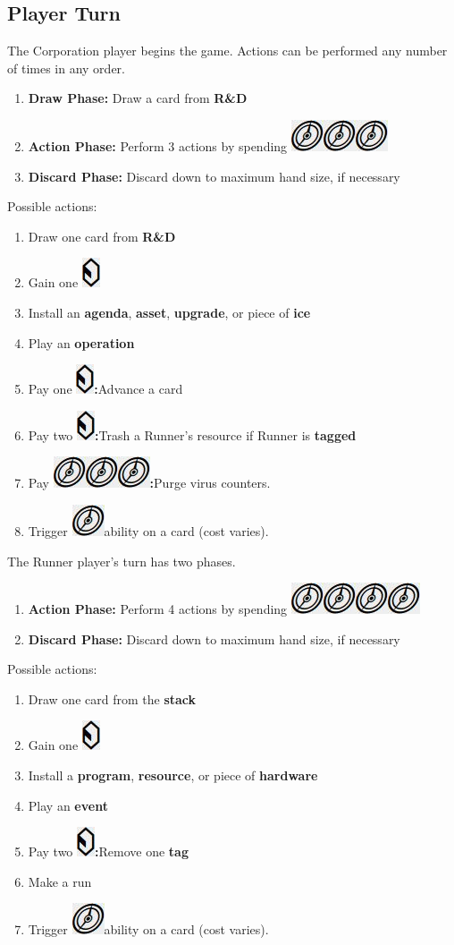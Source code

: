 \documentclass[12pt]{article}
\newenvironment{enumerateCustom}
{\begin{enumerate}
  \setlength{\itemsep}{1pt}
  \setlength{\parskip}{0pt}
  \setlength{\parsep}{0pt}}
{\end{enumerate}}
\newcommand{\credit}{\includegraphics[scale=0.40]{images/creditLarge.jpg}\hspace{0.3em}}
\newcommand{\creditWithColon}{\includegraphics[scale=0.45]{images/creditLarge.jpg}\textbf{:}\hspace{0.3em}}
\newcommand{\action}{\includegraphics[scale=0.40]{images/actionLarge.jpg}\hspace{0.3em}}
\newcommand{\actionWithColon}{\includegraphics[scale=0.45]{images/actionLarge.jpg}\textbf{:}\hspace{0.3em}}
\begin{document}
\begin{multicols*}{2}
\section*{Player Turn}
The Corporation player begins the game. Actions can be performed any number of times in any order.
\begin{enumerateCustom}
	\item \textbf{Draw Phase:} Draw a card from \textbf{R\&D}
	\item \textbf{Action Phase:} Perform 3 actions by spending \action \action \action
	\item \textbf{Discard Phase:} Discard down to maximum hand size, if necessary
\end{enumerateCustom}
Possible actions:
\begin{enumerateCustom}
	\item Draw one card from \textbf{R\&D}
	\item Gain one \credit
	\item Install an \textbf{agenda}, \textbf{asset}, \textbf{upgrade}, or piece of \textbf{ice}
	\item Play an \textbf{operation}
	\item Pay one \creditWithColon Advance a card
	\item Pay two \creditWithColon Trash a Runner's resource if Runner is \textbf{tagged}
	\item Pay \action \action \actionWithColon Purge virus counters.
	\item Trigger \action ability on a card (cost varies).
\end{enumerateCustom}

The Runner player's turn has two phases.
\begin{enumerateCustom}
	\item \textbf{Action Phase:} Perform 4 actions by spending \action \action \action \action
	\item \textbf{Discard Phase:} Discard down to maximum hand size, if necessary
\end{enumerateCustom}
Possible actions:
\begin{enumerateCustom}
	\item Draw one card from the \textbf{stack}
	\item Gain one \credit
	\item Install a \textbf{program}, \textbf{resource}, or piece of \textbf{hardware}
	\item Play an \textbf{event}
	\item Pay two \creditWithColon Remove one \textbf{tag}
	\item Make a run
	\item Trigger \action ability on a card (cost varies).
\end{enumerateCustom}


\end{multicols*}
\end{document}
